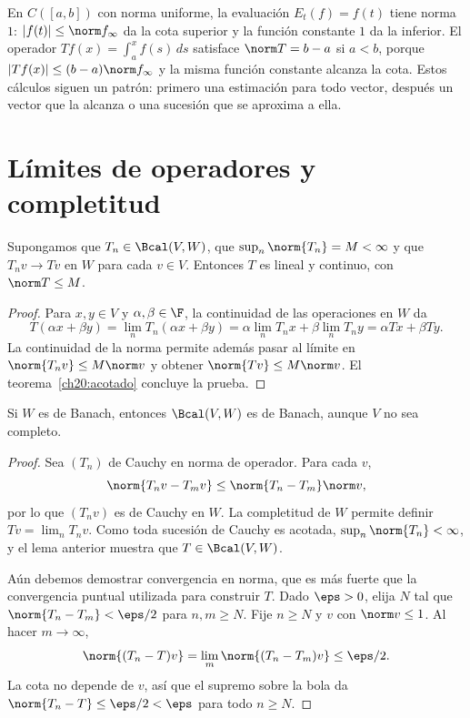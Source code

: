 \begin{ejemplo}
En $C([a,b])$ con norma uniforme, la evaluación $E_t(f)=f(t)$ tiene norma $1$: $|f(t)|\leq\norm f_\infty$ da la cota superior y la función constante $1$ da la inferior. El operador $Tf(x)=\int_a^x f(s)\,ds$ satisface $\norm T=b-a$ si $a<b$, porque $|Tf(x)|\leq(b-a)\norm f_\infty$ y la misma función constante alcanza la cota. Estos cálculos siguen un patrón: primero una estimación para todo vector, después un vector que la alcanza o una sucesión que se aproxima a ella.
\end{ejemplo}

\section{Límites de operadores y completitud}

\begin{lema}\label{ch20:limite-puntual}
Supongamos que $T_n\in\Bcal(V,W)$, que $\sup_n\norm{T_n}=M<\infty$ y que $T_nv\to Tv$ en $W$ para cada $v\in V$. Entonces $T$ es lineal y continuo, con $\norm T\leq M$.
\end{lema}
\begin{proof}
Para $x,y\in V$ y $\alpha,\beta\in\F$, la continuidad de las operaciones en $W$ da
\[
 T(\alpha x+\beta y)=\lim_nT_n(\alpha x+\beta y)
 =\alpha\lim_nT_nx+\beta\lim_nT_ny=\alpha Tx+\beta Ty.
\]
La continuidad de la norma permite además pasar al límite en $\norm{T_nv}\leq M\norm v$ y obtener $\norm{Tv}\leq M\norm v$. El teorema~\ref{ch20:acotado} concluye la prueba.
\end{proof}

\begin{teorema}\label{ch20:banach-operadores}
Si $W$ es de Banach, entonces $\Bcal(V,W)$ es de Banach, aunque $V$ no sea completo.
\end{teorema}
\begin{proof}
Sea $(T_n)$ de Cauchy en norma de operador. Para cada $v$,
\[
 \norm{T_nv-T_mv}\leq\norm{T_n-T_m}\norm v,
\]
por lo que $(T_nv)$ es de Cauchy en $W$. La completitud de $W$ permite definir $Tv=\lim_nT_nv$. Como toda sucesión de Cauchy es acotada, $\sup_n\norm{T_n}<\infty$, y el lema anterior muestra que $T\in\Bcal(V,W)$.

Aún debemos demostrar convergencia en norma, que es más fuerte que la convergencia puntual utilizada para construir $T$. Dado $\eps>0$, elija $N$ tal que $\norm{T_n-T_m}<\eps/2$ para $n,m\geq N$. Fije $n\geq N$ y $v$ con $\norm v\leq1$. Al hacer $m\to\infty$,
\[
 \norm{(T_n-T)v}=\lim_m\norm{(T_n-T_m)v}\leq\eps/2.
\]
La cota no depende de $v$, así que el supremo sobre la bola da $\norm{T_n-T}\leq\eps/2<\eps$ para todo $n\geq N$.
\end{proof}

